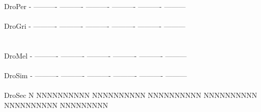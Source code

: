 \documentclass[11pt,twoside,reqno,a4paper]{article}
\begin{document}
{DroPer	-	----------	----------	----------	----------	----------	---------\\
\hspace*{7\charwidth}\hspace*{1\charwidth}\hspace*{1\charwidth}\hspace*{1\charwidth}\hspace*{1\charwidth}\hspace*{1\charwidth}\hspace*{1\charwidth}\\
DroGri	-	----------	----------	----------	----------	----------	---------\\
\hspace*{7\charwidth}\hspace*{1\charwidth}\hspace*{1\charwidth}\hspace*{1\charwidth}\hspace*{1\charwidth}\hspace*{1\charwidth}\hspace*{1\charwidth}\\
\\
DroMel	-	----------	----------	----------	----------	----------	---------\\
\hspace*{7\charwidth}\hspace*{1\charwidth}\hspace*{1\charwidth}\hspace*{1\charwidth}\hspace*{1\charwidth}\hspace*{1\charwidth}\hspace*{1\charwidth}\\
DroSim	-	----------	----------	----------	----------	----------	---------\\
\hspace*{7\charwidth}\hspace*{1\charwidth}\hspace*{1\charwidth}\hspace*{1\charwidth}\hspace*{1\charwidth}\hspace*{1\charwidth}\hspace*{1\charwidth}\\
DroSec	N	NNNNNNNNNN	NNNNNNNNNN	NNNNNNNNNN	NNNNNNNNNN	NNNNNNNNNN	NNNNNNNNN\\
\hspace*{7\charwidth}\hspace*{1\charwidth}\hspace*{1\charwidth}\hspace*{1\charwidth}\hspace*{1\charwidth}\hspace*{1\charwidth}\hspace*{1\charwidth}\\
}
\end{document}
